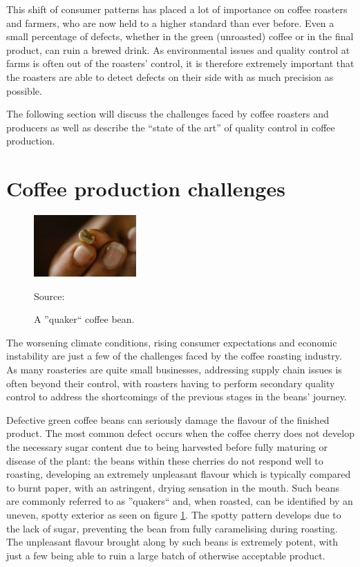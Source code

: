 This shift of consumer patterns has placed a lot of importance on coffee
roasters and farmers, who are now held to a higher standard than ever before.
Even a small percentage of defects, whether in the green (unroasted) coffee or in
the final product, can ruin a brewed drink.
As environmental issues and quality control
at farms is often out of the roasters' control, it is therefore extremely important
that the roasters are able to detect defects on their side with as much precision
as possible.

The following section will discuss the challenges faced by coffee roasters and producers
as well as describe the ``state of the art'' of quality control in coffee production.

\section{Coffee production challenges}
\label{sec:coffee-production-challenges}
\begin{figure}
	\includegraphics[width=0.35\textwidth]{figures/introduction/quaker-coffee-bean}
	\caption*
	{Source: \cite{quakerBeanImg}}
	\caption{A ''quaker`` coffee bean.}
	\label{fig:quakerBeanExample}
	\vspace{-2em}
\end{figure}
The worsening climate conditions,
rising consumer expectations and economic instability are just a few of the
challenges faced by the coffee roasting industry.
As many roasteries are quite small
businesses, addressing supply chain issues is often beyond their control, with roasters
having to perform secondary quality control to address the shortcomings of the previous
stages in the beans' journey.

Defective green coffee beans can seriously damage the flavour of the finished
product.
The most common defect occurs when the coffee cherry does not develop the
necessary sugar content due to being harvested before fully maturing or disease of
the plant: the beans within these cherries do not respond well to roasting, developing
an extremely unpleasant flavour which is typically compared to burnt paper, with
an astringent, drying sensation in the mouth.
Such beans are commonly referred
to as ''quakers`` and, when roasted, can be identified by an uneven, spotty exterior
as seen on figure \ref{fig:quakerBeanExample}.
The spotty pattern develops due
to the lack of sugar, preventing the bean from fully caramelising during roasting.
The unpleasant flavour brought along by such beans is extremely potent, with just
a few being able to ruin a large batch of otherwise acceptable product.

